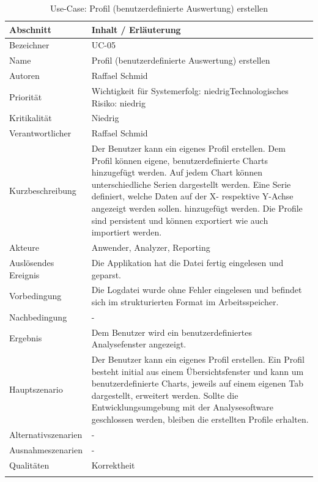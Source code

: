 \begin{longtable}{|p{4cm}|p{10.5cm}|}
\hline
   \textbf{Abschnitt} & \textbf{Inhalt / Erläuterung} \\\hline
   Bezeichner & UC-05\\\hline
   Name &Profil (benutzerdefinierte Auswertung) erstellen\\\hline
   Autoren & Raffael Schmid\\\hline
   Priorität & Wichtigkeit für Systemerfolg: niedrig\newline Technologisches Risiko: niedrig\\\hline
   Kritikalität & Niedrig\\\hline
   Verantwortlicher & Raffael Schmid\\\hline
   Kurzbeschreibung & Der Benutzer kann ein eigenes Profil erstellen. Dem Profil können eigene, benutzerdefinierte Charts hinzugefügt werden. Auf jedem Chart können unterschiedliche Serien dargestellt werden. Eine Serie definiert, welche Daten auf der X- respektive Y-Achse angezeigt werden sollen. hinzugefügt werden. Die Profile sind persistent und können exportiert wie auch importiert werden.\\\hline
   Akteure & Anwender, Analyzer, Reporting\\\hline
   Auslösendes Ereignis & Die Applikation hat die Datei fertig eingelesen und geparst.\\\hline
   Vorbedingung & Die Logdatei wurde ohne Fehler eingelesen und befindet sich im strukturierten Format im Arbeitsspeicher.\\\hline
   Nachbedingung & -\\\hline
   Ergebnis & Dem Benutzer wird ein benutzerdefiniertes Analysefenster angezeigt.\\\hline
   Hauptszenario &Der Benutzer kann ein eigenes Profil erstellen. Ein Profil besteht initial aus einem Übersichtsfenster und kann um benutzerdefinierte Charts, jeweils auf einem eigenen Tab dargestellt, erweitert werden. Sollte die Entwicklungsumgebung mit der Analysesoftware geschlossen werden, bleiben die erstellten Profile erhalten.\\\hline
   Alternativszenarien & -\\\hline
   Ausnahmeszenarien & -\\\hline
   Qualitäten & Korrektheit \\\hline
\caption{Use-Case: Profil (benutzerdefinierte Auswertung) erstellen }
\end{longtable}




